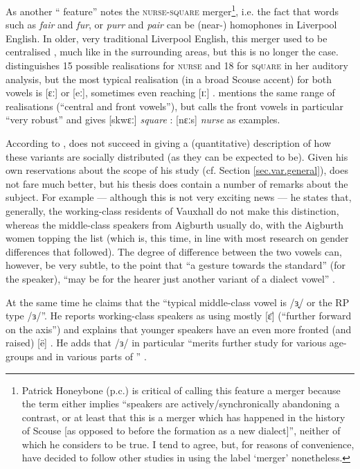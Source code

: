 As another `` feature'' \citet[72]{trudgill1999} notes the \textsc{nurse}-\textsc{square} merger\footnote{Patrick Honeybone (p.c.) is critical of calling this feature a merger because the term either implies \enquote{speakers are actively/synchronically abandoning a contrast, or at least that this is a merger which has happened in the history of Scouse [as opposed to before the formation as a new dialect]}, neither of which he considers to be true. I tend to agree, but, for reasons of convenience, have decided to follow other studies \parencite{trudgill1999,watsonclark2013} in using the label \enquote*{merger} nonetheless.}, i.e. the fact that words such as \emph{fair} and \emph{fur}, or \emph{purr} and \emph{pair} can be (near-) homophones in Liverpool English.
In older, very traditional Liverpool English, this merger used to be centralised \parencite[cf.][323]{west2015}, much like in the surrounding areas, but this is no longer the case.
\citet[cf.][68 and 71]{delyon1981} distinguishes 15 possible realisations for \textsc{nurse} and 18 for \textsc{square} in her auditory analysis, but the most typical realisation (in a broad Scouse accent) for both vowels is [ɛː] or [eː], sometimes even reaching [ɪː] \citep[cf.][358]{watson2007}.
\citet[127]{honeybone2007} mentions the same range of realisations (``central and front vowels''), but calls the front vowels in particular ``very robust'' and gives [skwɛː] \emph{square} : [nɛːs] \emph{nurse} as examples.

According to \citet[358]{watson2007}, \textcite{delyon1981} does not succeed in giving a (quantitative) description of how these variants are socially distributed (as they can be expected to be).
Given his own reservations about the scope of his study (cf. Section \ref{sec.var.general}), \citet{knowles1973} does not fare much better, but his thesis does contain a number of remarks about the subject.
For example --- although this is not very exciting news --- he states that, generally, the working-class residents of Vauxhall do not make this distinction, whereas the middle-class speakers from Aigburth usually do, with the Aigburth women topping the list (which is, this time, in line with most research on gender differences that followed).
The degree of difference between the two vowels can, however, be very subtle, to the point that ``a gesture towards the  standard'' (for the speaker), ``may be for the hearer just another variant of a dialect vowel'' \citep[cf.][295--297]{knowles1973}.

At the same time he claims that the ``typical middle-class vowel is /ɜ̟/ or the RP type /ɜ/''. He reports working-class speakers as using mostly [ɛ̈] (``further forward on the axis'') and explains that younger speakers have an even more fronted (and raised) [ë] \citep[271]{knowles1973}.
He adds that /ɜ/ in particular ``merits further study for various age-groups and in various parts of '' \citeyearpar[320]{knowles1973}.

